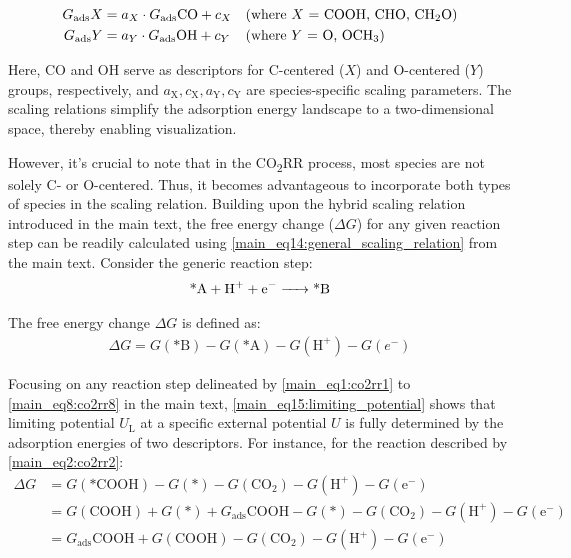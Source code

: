 \begin{align}
  G_{\text{ads}}X &= a_X \cdot G_{\text{ads}}{\text{CO}} + c_X
  && \text{(where  $X$ = COOH, CHO, CH\textsubscript{2}O)}  \label{supp_eq1:scaling_relation_x_co}  \\
  G_{\text{ads}}Y &= a_Y \cdot G_{\text{ads}}{\text{OH}} + c_Y
  && \text{(where  $Y$ = O, OCH\textsubscript{3})}          \label{supp_eq2:scaling_relation_y_oh}
\end{align}

Here, CO and OH serve as descriptors for C-centered ($X$) and O-centered ($Y$) groups, respectively, and $a_{\mathrm{X}}, c_{\mathrm{X}}, a_{\mathrm{Y}}, c_{\mathrm{Y}}$ are species-specific scaling parameters.
The scaling relations simplify the adsorption energy landscape to a two-dimensional space, thereby enabling visualization.

However, it's crucial to note that in the CO\textsubscript{2}RR process, most species are not solely C- or O-centered.
Thus, it becomes advantageous to incorporate both types of species in the scaling relation.
Building upon the hybrid scaling relation introduced in the main text, the free energy change ($\Delta\mathit{G}$) for any given reaction step can be readily calculated using \cref{main_eq14:general_scaling_relation} from the main text.
Consider the generic reaction step:
\begin{align}
  \ce{\text{*}A + H+ + e- -> \text{*}B}  \label{supp_eq3:generic_reaction}
\end{align}

The free energy change $\Delta\mathit{G}$ is defined as:
\begin{align}
  \Delta G = G(\text{*}\mathrm{B}) - G(\text{*}\mathrm{A}) - G(\mathrm{H}^+) - G(e^-)  \label{supp_eq4:free_energy_change}
\end{align}

Focusing on any reaction step delineated by \cref{main_eq1:co2rr1} to \cref{main_eq8:co2rr8} in the main text,
\cref{main_eq15:limiting_potential} shows that limiting potential $U_{\mathrm{L}}$ at a specific external potential $U$ is fully determined by the adsorption energies of two descriptors.
For instance, for the reaction described by \cref{main_eq2:co2rr2}:
\begin{align}
  \Delta G &= G(\text{*COOH}) - G(\text{*}) - G(\text{CO}_2) - G(\text{H}^+) - G(\text{e}^-)  \\
  &= G(\text{COOH}) + G(\text{*}) + G_{\text{ads}}\text{COOH} -
  G(\text{*}) - G(\text{CO}_2) -G(\text{H}^+) - G(\text{e}^-) \\
  &= G_{\text{ads}}\text{COOH} + G(\text{COOH}) - G(\text{CO}_2) -G(\text{H}^+) - G(\text{e}^-)  \label{supp_eq5:exp_reaction}
\end{align}

